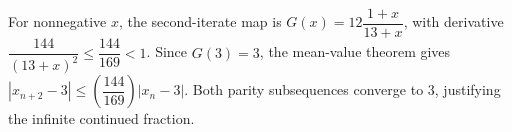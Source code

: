 For nonnegative $x$, the second-iterate map is $G(x)=12\dfrac{1+x}{13+x}$, with derivative $\dfrac{144}{(13+x)^2}\le\dfrac{144}{169}<1$. Since $G(3)=3$, the mean-value theorem gives $|x_{n+2}-3|\le(\dfrac{144}{169})|x_n-3|$. Both parity subsequences converge to $\boxed3$, justifying the infinite continued fraction.
